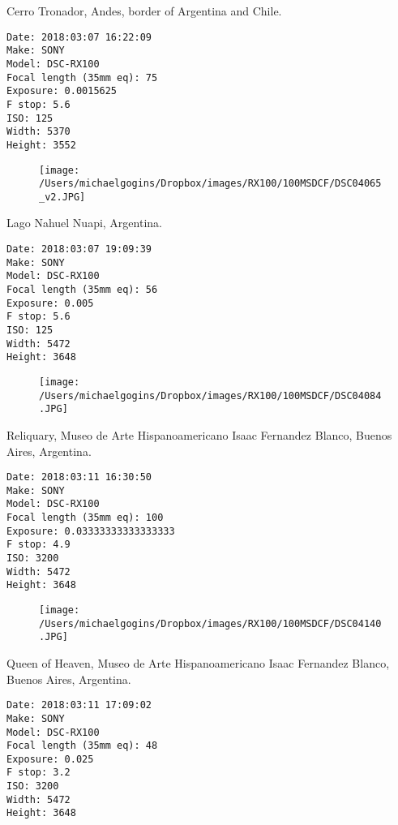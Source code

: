 \documentclass[11pt,letter,DIV=14,paper=landscape]{scrbook}
\begin{document}
\clearpage
\noindent Cerro Tronador, Andes, border of Argentina and Chile.
\noindent
\begin{lstlisting}
Date: 2018:03:07 16:22:09
Make: SONY
Model: DSC-RX100
Focal length (35mm eq): 75
Exposure: 0.0015625
F stop: 5.6
ISO: 125
Width: 5370
Height: 3552
\end{lstlisting}
\clearpage

\begin{figure}
\texttt{[image: /Users/michaelgogins/Dropbox/images/RX100/100MSDCF/DSC04065\_v2.JPG]}
\end{figure}
    
\clearpage
\noindent Lago Nahuel Nuapi, Argentina.
\noindent
\begin{lstlisting}
Date: 2018:03:07 19:09:39
Make: SONY
Model: DSC-RX100
Focal length (35mm eq): 56
Exposure: 0.005
F stop: 5.6
ISO: 125
Width: 5472
Height: 3648
\end{lstlisting}
\clearpage

\begin{figure}
\texttt{[image: /Users/michaelgogins/Dropbox/images/RX100/100MSDCF/DSC04084.JPG]}
\end{figure}
    
\clearpage
\noindent Reliquary, Museo de Arte Hispanoamericano Isaac Fernandez Blanco, Buenos Aires, Argentina.
\noindent
\begin{lstlisting}
Date: 2018:03:11 16:30:50
Make: SONY
Model: DSC-RX100
Focal length (35mm eq): 100
Exposure: 0.03333333333333333
F stop: 4.9
ISO: 3200
Width: 5472
Height: 3648
\end{lstlisting}
\clearpage

\begin{figure}
\texttt{[image: /Users/michaelgogins/Dropbox/images/RX100/100MSDCF/DSC04140.JPG]}
\end{figure}
    
\clearpage
\noindent Queen of Heaven, Museo de Arte Hispanoamericano Isaac Fernandez Blanco, Buenos Aires, Argentina.
\noindent
\begin{lstlisting}
Date: 2018:03:11 17:09:02
Make: SONY
Model: DSC-RX100
Focal length (35mm eq): 48
Exposure: 0.025
F stop: 3.2
ISO: 3200
Width: 5472
Height: 3648
\end{lstlisting}
\clearpage
\end{document}

